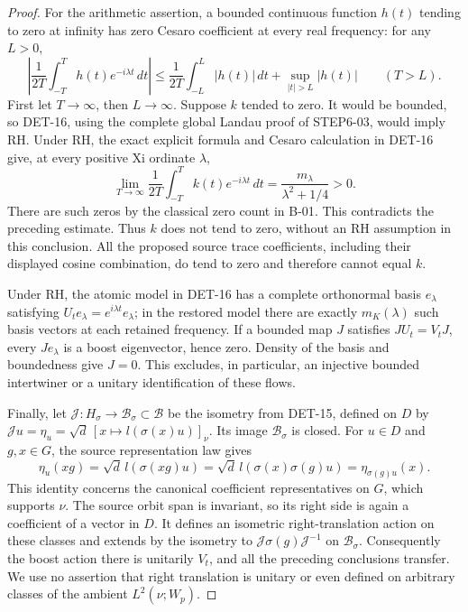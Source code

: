 \documentclass[11pt,a4paper]{article}
\newcommand{\fid}[1]{\textsf{#1}}
\begin{document}
\begin{proof}
For the arithmetic assertion, a bounded continuous function
\(h(t)\) tending to zero at infinity has zero Cesaro coefficient
at every real frequency: for any \(L>0\),
\[
 \left|\frac1{2T}\int_{-T}^{T}h(t)e^{-i\lambda t}\,dt\right|
 \le\frac{1}{2T}\int_{-L}^{L}|h(t)|\,dt
      +\sup_{|t|>L}|h(t)|\qquad(T>L).
\]
First let \(T\to\infty\), then \(L\to\infty\).
Suppose \(k\) tended to zero. It would be bounded, so
\fid{DET-16}, using the complete global Landau proof of
\fid{STEP6-03}, would imply RH. Under RH, the exact explicit
formula and Cesaro calculation in \fid{DET-16} give, at every
positive Xi ordinate \(\lambda\),
\[
 \lim_{T\to\infty}\frac1{2T}
       \int_{-T}^{T}k(t)e^{-i\lambda t}\,dt
 =\frac{m_\lambda}{\lambda^2+1/4}>0.
\]
There are such zeros by the classical zero count in \fid{B-01}.
This contradicts the preceding estimate. Thus \(k\) does not
tend to zero, without an RH assumption in this conclusion.
All the proposed source trace coefficients, including their
displayed cosine combination, do tend to zero and therefore
cannot equal \(k\).

Under RH, the atomic model in \fid{DET-16} has a complete
orthonormal basis \(e_\lambda\) satisfying
\(U_te_\lambda=e^{i\lambda t}e_\lambda\); in the restored
model there are exactly \(m_K(\lambda)\) such basis vectors
at each retained frequency. If a bounded map \(J\) satisfies
\(JU_t=V_tJ\), every \(Je_\lambda\) is a boost eigenvector,
hence zero. Density of the basis and boundedness give \(J=0\).
This excludes, in particular, an injective bounded intertwiner
or a unitary identification of these flows.

Finally, let
\(\mathcal J:H_\sigma\longrightarrow\mathcal B_\sigma
\subset\mathcal B\)
be the isometry from \fid{DET-15}, defined on \(D\) by
\(\mathcal Ju=\eta_u=\sqrt d\,[x\mapsto l(\sigma(x)u)]_\nu\).
Its image \(\mathcal B_\sigma\) is closed. For \(u\in D\)
and \(g,x\in G\), the source representation law gives
\[
 \eta_u(xg)=\sqrt d\,l(\sigma(xg)u)
          =\sqrt d\,l(\sigma(x)\sigma(g)u)
          =\eta_{\sigma(g)u}(x).
\]
This identity concerns the canonical coefficient representatives
on \(G\), which supports \(\nu\). The source orbit span is
invariant, so its right side is again a coefficient of a vector
in \(D\). It defines an isometric right-translation action on
these classes and extends by the isometry to
\(\mathcal J\sigma(g)\mathcal J^{-1}\) on
\(\mathcal B_\sigma\).
Consequently the boost action there is unitarily \(V_t\), and
all the preceding conclusions transfer. We use no assertion
that right translation is unitary or even defined on arbitrary
classes of the ambient \(L^2(\nu;W_p)\).
\end{proof}
\end{document}
